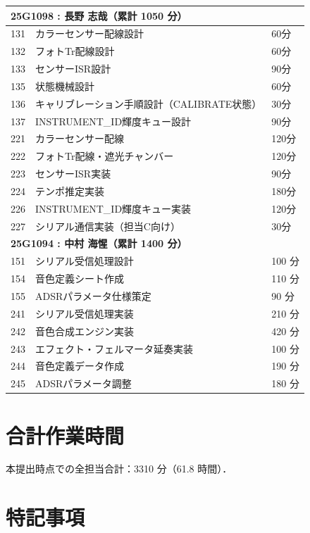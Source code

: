 \begin{longtable}{p{1.5cm}p{8cm}p{2.5cm}}
\multicolumn{3}{l}{\textbf{25G1098 : 長野 志哉（累計 1050 分）}} \\
\midrule
131 & カラーセンサー配線設計 & 60分 \\
132 & フォトTr配線設計 & 60分 \\
133 & センサーISR設計 & 90分 \\
135 & 状態機械設計 & 60分 \\
136 & キャリブレーション手順設計（CALIBRATE状態） & 30分 \\
137 & INSTRUMENT\_ID輝度キュー設計 & 90分 \\
221 & カラーセンサー配線 & 120分 \\
222 & フォトTr配線・遮光チャンバー & 120分 \\
223 & センサーISR実装 & 90分 \\
224 & テンポ推定実装 & 180分 \\
226 & INSTRUMENT\_ID輝度キュー実装 & 120分 \\
227 & シリアル通信実装（担当C向け） & 30分 \\

\multicolumn{3}{l}{\textbf{25G1094 : 中村 海惺（累計 1400 分）}} \\
\midrule
151 & シリアル受信処理設計 & 100 分 \\
154 & 音色定義シート作成 & 110 分 \\
155 & ADSRパラメータ仕様策定 & 90 分 \\
241 & シリアル受信処理実装 & 210 分 \\
242 & 音色合成エンジン実装 & 420 分 \\
243 & エフェクト・フェルマータ延奏実装 & 100 分 \\
244 & 音色定義データ作成 & 190 分 \\
245 & ADSRパラメータ調整 & 180 分 \\

\end{longtable}
\endgroup

\section{合計作業時間}

本提出時点での全担当合計：3310 分（61.8 時間）．

\section{特記事項}

